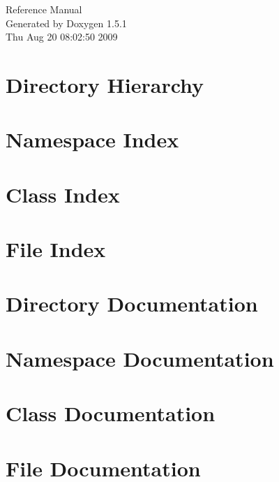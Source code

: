 \documentclass[a4paper]{book}
\begin{document}
\begin{titlepage}
\vspace*{7cm}
\begin{center}
{\Large Reference Manual}\\
\vspace*{1cm}
{\large Generated by Doxygen 1.5.1}\\
\vspace*{0.5cm}
{\small Thu Aug 20 08:02:50 2009}\\
\end{center}
\end{titlepage}
\clearemptydoublepage
{}
\tableofcontents
\clearemptydoublepage
{}
\chapter{Directory Hierarchy}

\chapter{Namespace Index}

\chapter{Class Index}

\chapter{File Index}

\chapter{Directory Documentation}

\chapter{Namespace Documentation}


\chapter{Class Documentation}




\chapter{File Documentation}







\printindex
\end{document}

